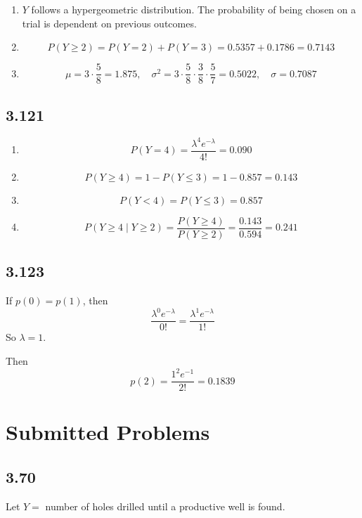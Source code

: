 \documentclass[
  letterpaper,
  DIV=11,
  numbers=noendperiod]{scrartcl}
\begin{document}
\begin{enumerate}
\def\labelenumi{(\alph{enumi})}
\item
  \(Y\) follows a hypergeometric distribution. The probability of being
  chosen on a trial is dependent on previous outcomes.
\item
  \[P(Y \geq 2) = P(Y=2) + P(Y=3) = 0.5357 + 0.1786 = 0.7143\]
\item
  \[\mu = 3 \cdot \frac{5}{8} = 1.875, \quad \sigma^2 = 3 \cdot \frac{5}{8} \cdot \frac{3}{8} \cdot \frac{5}{7} = 0.5022, \quad \sigma = 0.7087\]
\end{enumerate}

\subsection{3.121}\label{section-8}

\begin{enumerate}
\def\labelenumi{(\alph{enumi})}
\item
  \[P(Y=4) = \frac{\lambda^4 e^{-\lambda}}{4!} = 0.090\]
\item
  \[P(Y \geq 4) = 1 - P(Y \leq 3) = 1 - 0.857 = 0.143\]
\item
  \[P(Y < 4) = P(Y \leq 3) = 0.857\]
\item
  \[P(Y \geq 4 \mid Y \geq 2) = \frac{P(Y \geq 4)}{P(Y \geq 2)} = \frac{0.143}{0.594} = 0.241\]
\end{enumerate}

\subsection{3.123}\label{section-9}

If \(p(0) = p(1)\), then
\[\frac{\lambda^0 e^{-\lambda}}{0!} = \frac{\lambda^1 e^{-\lambda}}{1!}\]
So \(\lambda = 1\).

Then \[p(2) = \frac{1^2 e^{-1}}{2!} = 0.1839\]

\section{Submitted Problems}\label{submitted-problems}

\subsection{3.70}\label{section-10}

Let \(Y =\) number of holes drilled until a productive well is found.
\end{document}
